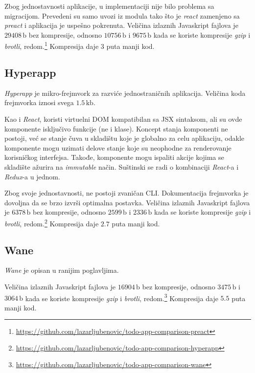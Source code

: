 Zbog jednostavnosti  aplikacije, u implementaciji nije bilo problema sa migracijom.
Prevedeni su samo uvozi iz modula tako što je \textsl{react} zamenjeno sa \textsl{preact} i aplikacija je uspešno pokrenuta.
Veličina izlaznih Javaskript fajlova je $29408\,\mathrm{b}$ bez kompresije, odnosno $10756\,\mathrm{b}$ i $9675\,\mathrm{b}$ kada se koriste kompresije \textsl{gzip} i \textsl{brotli}, redom.\footnote{\url{https://github.com/lazarljubenovic/todo-app-comparison-preact}} Kompresija daje $3$ puta manji kod.

\subsection{Hyperapp}

\textsl{Hyperapp} je mikro-frejmvork za razviće jednostraničnih aplikacija.
Veličina koda frejmvorka iznosi svega $1.5\,\mathrm{kb}$.

Kao i \textsl{React}, koristi virtuelni DOM kompatibilan sa JSX sintaksom, ali su ovde komponente isključivo funkcije (ne i klase).
Koncept stanja komponenti ne postoji, već se stanje čuva u skladištu koje je globalno za celu aplikaciju, odakle komponente mogu uzimati delove stanje koje su neophodne za renderovanje korisničkog interfejsa.
Takođe, komponente mogu ispaliti akcije kojima se skladište ažurira na \textit{immutable} način.
Suštinski se radi o kombinaciji \textit{React}-a i \textit{Redux}-a u jednom.

Zbog svoje jednostavnosti, ne postoji zvaničan CLI.
Dokumentacija frejmvorka je dovoljna da se brzo izvrši optimalna postavka.
Veličina izlaznih Javaskript fajlova je $6378\,\mathrm{b}$ bez kompresije, odnosno $2599\,\mathrm{b}$ i $2336\,\mathrm{b}$ kada se koriste kompresije \textsl{gzip} i \textsl{brotli}, redom.\footnote{\url{https://github.com/lazarljubenovic/todo-app-comparison-hyperapp}} Kompresija daje $2.7$ puta manji kod.

\subsection{Wane}

\textsl{Wane} je opisan u ranijim poglavljima.

Veličina izlaznih Javaskript fajlova je $16904\,\mathrm{b}$ bez kompresije, odnosno $3475\,\mathrm{b}$ i $3064\,\mathrm{b}$ kada se koriste kompresije \textsl{gzip} i \textsl{brotli}, redom.\footnote{\url{https://github.com/lazarljubenovic/todo-app-comparison-wane}} Kompresija daje $5.5$ puta manji kod.

